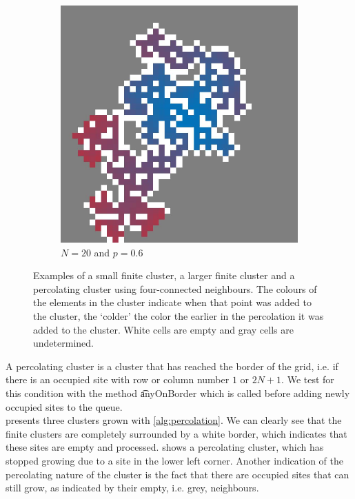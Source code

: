 \begin{figure}[t!]
	\begin{subfigure}{\columnwidth}
		\centering
		\includegraphics[width=\textwidth, height=0.225\textheight, keepaspectratio=true]{./img/fancy_cluster_N20_p6_rng_5}
		\caption{$N = 20$ and $p = 0.6$}
		\label{fig:method:fin_inf:infinite}
	\end{subfigure}	
	\caption{Examples of  a small finite cluster,  a larger finite cluster and  a percolating cluster using four-connected neighbours. The colours of the elements in the cluster indicate when that point was added to the cluster, the `colder' the color the earlier in the percolation it was added to the cluster. White cells are empty and gray cells are undetermined. }
	\label{fig:method:fin_inf}
\end{figure}


A percolating cluster is a cluster that has reached the border of the grid, i.e. if there is an occupied site with row or column number $1$ or $2N + 1$. We test for this condition with the method \t{anyOnBorder} which is called before adding newly occupied sites to the queue.\\

 presents three clusters grown with \cref{alg:percolation}. We can clearly see that the finite clusters are completely surrounded by a white border, which indicates that these sites are empty and processed.  shows a percolating cluster, which has stopped growing due to a site in the lower left corner.
Another indication of the percolating nature of the cluster is the fact that there are occupied sites that can still grow, as indicated by their empty, i.e. grey, neighbours.

